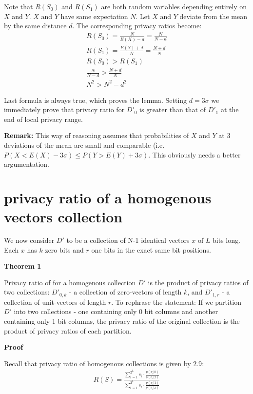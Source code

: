 \documentclass[11pt,draft]{article}
\begin{document}
Note that $R(S_0)$ and $R(S_1)$ are both random variables depending entirely on $X$ and $Y$.  $X$ and $Y$ have same expectation $N$. 
Let $X$ and $Y$ deviate from the mean by the same distance $d$.  The corresponding privacy ratios become:
\begin{align}
R(S_0) =  \frac{N}{E(X) - d} =   \frac{N}{N - d}\\
R(S_1) =  \frac{E(Y) + d}{N}  = \frac{N + d}{N}\\
R(S_0) > R(S_1) \\
 \frac{N}{N - d} >  \frac{N + d}{N} \\
 N^2 > N^2  - d^2
\end{align}

Last formula is always true, which proves the lemma.  Setting $d = 3\sigma$ we immediately prove that privacy ratio for $D'_0$  is greater than that of $D'_1$ at the end of local privacy range.

\textbf{Remark: } This way of reasoning assumes that probabilities of $X$ and $Y$ at 3 deviations of the mean are small and comparable (i.e. $P(X< E(X) - 3\sigma) \le P(Y > E(Y) + 3\sigma)$. 
This obviously needs a better argumentation.

\section{privacy ratio of a homogenous vectors collection}

We now consider $D'$ to be a collection of N-1 identical vectors $x$ of $L$ bits long.  Each $x$ has $k$ zero bits and $r$ one bits in the exact same bit positions.

\textbf{Theorem 1}

Privacy ratio of for a homogenous collection $D'$ is the product of privacy ratios of two collections: $D'_{0,k}$ - a collection of zero-vectors of length $k$,  and $D'_{1,r}$ - a collection of unit-vectors of length $r$.
To rephrase the statement:  If we partition $D'$ into two collections - one containing only 0 bit columns and another containing only 1 bit columns, the privacy ratio of the original collection is the product of privacy ratios of each partition.

\textbf{Proof}
  
Recall that privacy ratio of homogenous collections is given by $2.9$:
\begin{align}
R(S) = \frac{ \sum_{i=1}^{2^L} s_i  \cdot \frac{p(v_i|0)}{p(v_i|x)}   } { \sum_{i=1}^{2^L}  s_i \cdot  \frac{p(v_i|1)}{p(v_i|x)}   } 
\end{align}
\end{document}
